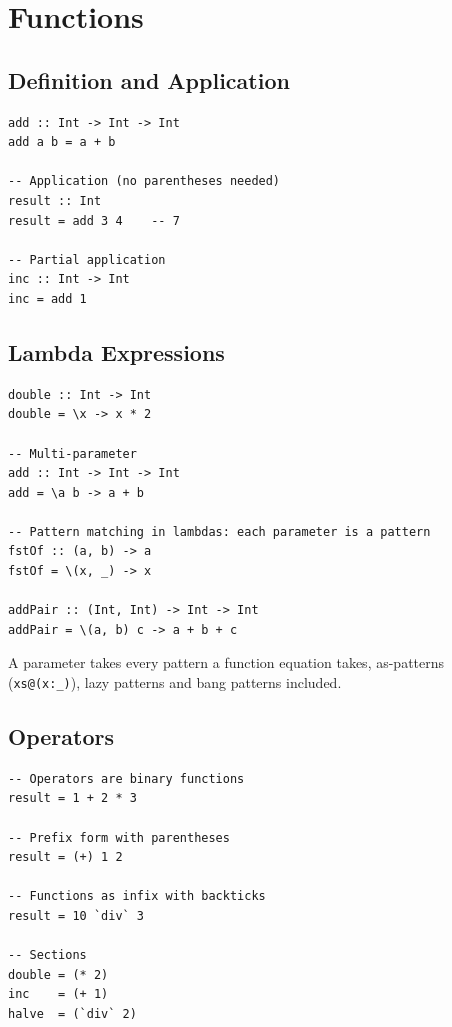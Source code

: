 \documentclass[11pt,a4paper]{article}
\begin{document}
\section{Functions}

\subsection{Definition and Application}

\begin{lstlisting}
add :: Int -> Int -> Int
add a b = a + b

-- Application (no parentheses needed)
result :: Int
result = add 3 4    -- 7

-- Partial application
inc :: Int -> Int
inc = add 1
\end{lstlisting}

\subsection{Lambda Expressions}

\begin{lstlisting}
double :: Int -> Int
double = \x -> x * 2

-- Multi-parameter
add :: Int -> Int -> Int
add = \a b -> a + b

-- Pattern matching in lambdas: each parameter is a pattern
fstOf :: (a, b) -> a
fstOf = \(x, _) -> x

addPair :: (Int, Int) -> Int -> Int
addPair = \(a, b) c -> a + b + c
\end{lstlisting}

A parameter takes every pattern a function equation takes, as-patterns
(\texttt{xs@(x:\_)}), lazy patterns and bang patterns included.

\subsection{Operators}

\begin{lstlisting}
-- Operators are binary functions
result = 1 + 2 * 3

-- Prefix form with parentheses
result = (+) 1 2

-- Functions as infix with backticks
result = 10 `div` 3

-- Sections
double = (* 2)
inc    = (+ 1)
halve  = (`div` 2)
\end{lstlisting}
\end{document}
